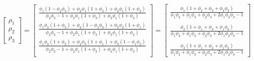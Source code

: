 \documentclass{article}
\begin{document}
\[ \left[ \begin{matrix}
    \rho_1 \\ \rho_2 \\ \rho_3
\end{matrix} \right] = \left[\begin{matrix}
    \frac{\phi_1(1 - \phi_2\phi_3)  + \phi_2\phi_1(1+\phi_3) + \phi_3\phi_1(1+\phi_2)}{\phi_2\phi_3 - 1 + \phi_2\phi_1(1+\phi_3) + \phi_3\phi_1(1+\phi_2)} \\
    \frac{\phi_1\phi_2(1+\phi_3) + \phi_2(1-\phi_1\phi_3) + \phi_3\phi_2(1+\phi_1)}{\phi_2\phi_3 - 1 + \phi_2\phi_1(1+\phi_3) + \phi_3\phi_1(1+\phi_2)}\\
    \frac{\phi_1\phi_3(1+\phi_2) +\phi_2\phi_3(1+\phi_1) + \phi_3(1-\phi_1\phi_2)}{\phi_2\phi_3 - 1 + \phi_2\phi_1(1+\phi_3) + \phi_3\phi_1(1+\phi_2)}\\
\end{matrix}\right] = \left[\begin{matrix}
    \frac{\phi_1\left(1 + \phi_2 + \phi_3 + \phi_2\phi_3\right)}{\phi_1\phi_2 + \phi_1\phi_3 + \phi_2\phi_3 + 2\phi_1\phi_2\phi_3 - 1} \\ \\
    \frac{\phi_2\left(1 + \phi_1 + \phi_3 + \phi_1\phi_3\right)}{\phi_1\phi_2 + \phi_1\phi_3 + \phi_2\phi_3 + 2\phi_1\phi_2\phi_3 - 1} \\ \\
    \frac{\phi_3\left(1 + \phi_1 + \phi_2 + \phi_1\phi_2\right)}{\phi_1\phi_2 + \phi_1\phi_3 + \phi_2\phi_3 + 2\phi_1\phi_2\phi_3 - 1}
\end{matrix}\right]
\]
\end{document}
